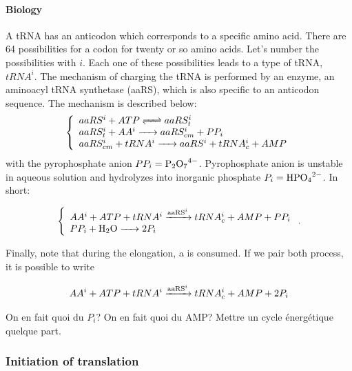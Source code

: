 \paragraph{Biology} A tRNA has an anticodon which corresponds to a specific amino acid. There are 64 possibilities for a codon for twenty or so amino acids. Let's number the possibilities with $i$. Each one of these possibilities leads to a type of tRNA, $tRNA^i$. The mechanism of charging the tRNA is performed by an enzyme, an aminoacyl tRNA synthetase (aaRS), which is also specific to an anticodon sequence. The mechanism is described below:
$$
  \left\{
    \begin{array}{l}
      \reactionRev{aaRS^i + ATP}{aaRS^i_t}{}{} \\
      \reactionIrr{aaRS^i_t + AA^i}{aaRS^i_{cm}+PP_i}{}{} \\
      \reactionIrr{aaRS^i_{cm} + tRNA^i}{aaRS^i + tRNA^i_c + AMP}{}{} \\
    \end{array}
  \right.
$$
with the pyrophosphate anion $PP_i=\ce{P2O7^4-}$. Pyrophosphate anion is unstable in aqueous solution and hydrolyzes into inorganic phosphate $P_i=\ce{HPO4^2-}$. In short:
\begin{mdframed}[style=MyFrame]
$$
  \left\{
    \begin{array}{l}
    \reactionIrr{AA^i+ATP+tRNA^i}{tRNA^i_c+AMP+PP_i}{aaRS^i}{} \\
    \reactionIrr{PP_i + \ce{H2O}}{2P_i}{}{} \\
  \end{array}
  \right. .
$$
\end{mdframed}
Finally, note that during the elongation, a  is consumed. If we pair both process, it is possible to write
\begin{mdframed}[style=MyFrame]
$$
  \reactionIrr{AA^i+ATP+tRNA^i}{tRNA^i_c+AMP+2P_i}{aaRS^i}{} \\
$$
\end{mdframed}
\textcolor[rgb]{1.00,0.00,0.00}{On en fait quoi du $P_i$?}
\textcolor[rgb]{1.00,0.00,0.00}{On en fait quoi du AMP? Mettre un cycle énergétique quelque part.}


\subsubsection{Initiation of translation}
